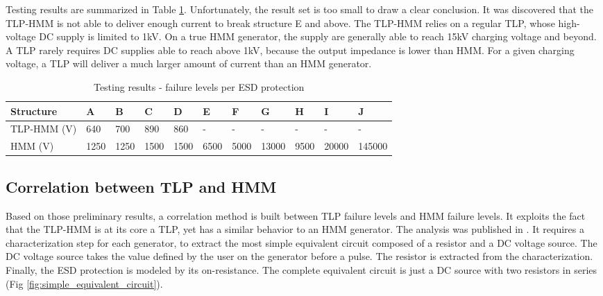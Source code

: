 Testing results are summarized in Table \ref{tab:esd-protections}.
Unfortunately, the result set is too small to draw a clear conclusion.
It was discovered that the TLP-HMM is not able to deliver enough current to break structure E and above.
The TLP-HMM relies on a regular TLP, whose high-voltage DC supply is limited to 1kV.
On a true HMM generator, the supply are generally able to reach 15kV charging voltage and beyond.
A TLP rarely requires DC supplies able to reach above 1kV, because the output impedance is lower than HMM.
For a given charging voltage, a TLP will deliver a much larger amount of current than an HMM generator.

\begin{table}[!h]
\centering
\begin{tabular}{@{}lllllllllll@{}}
\toprule
Structure   & A     & B     & C      & D    & E    & F    & G     & H    & I     & J      \\ \midrule
TLP-HMM (V) & 640   & 700   & 890    & 860  & -    & -    & -     & -    & -     & -      \\
HMM     (V) & 1250  & 1250  & 1500   & 1500 & 6500 & 5000 & 13000 & 9500 & 20000 & 145000 \\
\end{tabular}
\caption{Testing results - failure levels per ESD protection}
\label{tab:esd-protections}
\end{table}

\subsection{Correlation between TLP and HMM}

Based on those preliminary results, a correlation method is built between TLP failure levels and HMM failure levels.
It exploits the fact that the TLP-HMM is at its core a TLP, yet has a similar behavior to an HMM generator.
The analysis was published in \cite{my-publi-tlp-hmm}.
It requires a characterization step for each generator, to extract the most simple equivalent circuit composed of a resistor and a DC voltage source.
The DC voltage source takes the value defined by the user on the generator before a pulse.
The resistor is extracted from the characterization.
Finally, the ESD protection is modeled by its on-resistance.
The complete equivalent circuit is just a DC source with two resistors in series (Fig \ref{fig:simple_equivalent_circuit}).

